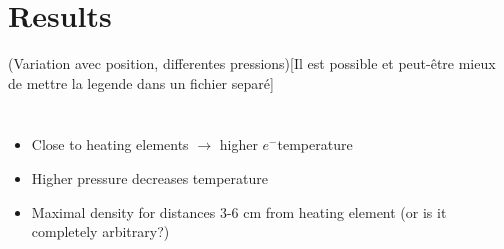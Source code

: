 \documentclass[10pt]{beamer}
\newcommand{\electron}[0]{$e^{-}$}
\begin{document}
\section{Results}
\begin{frame}{(Variation avec position, differentes pressions)}{[Il est possible et peut-être mieux de mettre la legende dans un fichier separé]}
    \begin{columns}[T]
        \centering
        \begin{itemize}
            \item Close to heating elements \(\rightarrow\) higher \electron temperature
            \item Higher pressure decreases temperature
            \item Maximal density for distances 3-6 cm from heating element (or is it completely arbitrary?)
        \end{itemize}

        \centering
    \end{columns}

    
\end{frame}
    
\end{document}
